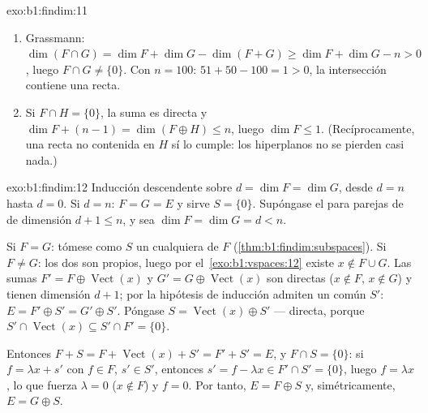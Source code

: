 \begin{solution}{exo:b1:findim:11}
\begin{enumerate}
  \item Grassmann: $\dim(F \cap G) = \dim F + \dim G - \dim(F +
        G) \geq \dim F + \dim G - n > 0$, luego
        $F \cap G \neq \{0\}$. Con $n = 100$: $51 + 50 - 100 = 1 >
        0$, la intersección contiene una recta.
  \item Si $F \cap H = \{0\}$, la suma es directa y
        $\dim F + (n - 1) = \dim(F \oplus H) \leq n$, luego
        $\dim F \leq 1$. (Recíprocamente, una recta no contenida en
        $H$ sí lo cumple: los hiperplanos no se pierden casi nada.)
\end{enumerate}
\end{solution}

\begin{solution}{exo:b1:findim:12}
Inducción descendente sobre $d = \dim F = \dim G$, desde $d = n$
hasta $d = 0$. Si $d = n$: $F = G = E$ y sirve $S = \{0\}$.
Supóngase el  para parejas de  de dimensión
$d + 1 \leq n$, y sea $\dim F = \dim G = d < n$.

Si $F = G$: tómese como $S$ un  cualquiera de $F$
(\cref{thm:b1:findim:subspaces}). Si $F \neq G$: los dos son propios,
luego por el~\cref{exo:b1:vspaces:12} existe $x \notin F \cup G$. Las
sumas $F' = F \oplus \operatorname{Vect}(x)$ y
$G' = G \oplus \operatorname{Vect}(x)$ son directas ($x \notin F$,
$x \notin G$) y tienen dimensión $d + 1$; por la hipótesis de
inducción admiten un  común $S'$:
$E = F' \oplus S' = G' \oplus S'$. Póngase
$S = \operatorname{Vect}(x) \oplus S'$ --- directa, porque
$S' \cap \operatorname{Vect}(x) \subseteq S' \cap F' = \{0\}$.

Entonces $F + S = F + \operatorname{Vect}(x) + S' = F' + S' = E$, y
$F \cap S = \{0\}$: si $f = \lambda x + s'$ con $f \in F$,
$s' \in S'$, entonces $s' = f - \lambda x \in F' \cap S' = \{0\}$,
luego $f = \lambda x$, lo que fuerza $\lambda = 0$ ($x \notin F$) y
$f = 0$. Por tanto, $E = F \oplus S$ y, simétricamente,
$E = G \oplus S$.
\end{solution}

